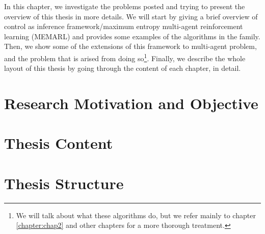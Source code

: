 \label{chapter:intro}
\begin{miniabstract}
    In this chapter, we investigate the problems posted and trying to present the overview of this thesis in more details. We will start by giving a brief overview of control as inference framework/maximum entropy multi-agent reinforcement learning (MEMARL) and provides some examples of the algorithms in the family. Then, we show some of the extensions of this framework to multi-agent problem, and the problem that is arised from doing so\footnote{We will talk about what these algorithms do, but we refer mainly to chapter \ref{chapter:chap2} and other chapters for a more thorough treatment.}. Finally, we describe the whole layout of this thesis by going through the content of each chapter, in detail.  
\end{miniabstract}


\section{Research Motivation and Objective}


\section{Thesis Content}


\section{Thesis Structure}
